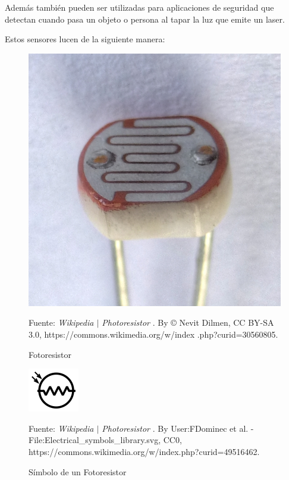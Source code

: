 \documentclass{article}
\begin{document}
Además también pueden ser utilizadas para aplicaciones de seguridad que
detectan cuando pasa un objeto o persona al tapar la luz que emite un laser.

\bigbreak

Estos sensores lucen de la siguiente manera:

\begin{figure}[H]
\centering
\includegraphics[width=0.2\paperwidth]{images/ldr.jpg}
\caption{Fotoresistor}\footnotesize
Fuente: \textit{Wikipedia $\mid$ Photoresistor} \cite{wikipedia-ldr-2022}. By
© Nevit Dilmen, CC BY-SA 3.0, https://commons.wikimedia.org/w/index
.php?curid=30560805.
\end{figure}

\begin{figure}[H]
\centering
\includegraphics[width=0.2\paperwidth]{images/ldr-symbol}
\caption{Símbolo de un Fotoresistor}\footnotesize
Fuente: \textit{Wikipedia $\mid$ Photoresistor} \cite{wikipedia-ldr-2022}. By
User:FDominec et al. - File:Electrical\_symbols\_library.svg, CC0,
https://commons.wikimedia.org/w/index.php?curid=49516462.
\end{figure}
\end{document}

